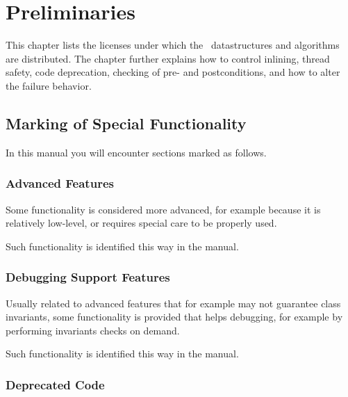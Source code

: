 
\chapter{Preliminaries}


This chapter lists the licenses
under which the \cgal\ datastructures and algorithms are distributed.
The chapter further explains how to control inlining, thread safety, 
code deprecation, checking of pre- and postconditions,
and how to alter the failure behavior. 





\section{Marking of Special Functionality}

In this manual you will encounter sections marked as follows.

\subsection{Advanced Features}

Some functionality is considered more advanced, for example because it is
relatively low-level, or requires special care to be properly used.

\begin{ccAdvanced}
Such functionality is identified this way in the manual.
\end{ccAdvanced}

\subsection{Debugging Support Features}

Usually related to advanced features that for example may not guarantee
class invariants, some functionality is provided that helps debugging,
for example by performing invariants checks on demand.

\begin{ccDebug}
Such functionality is identified this way in the manual.
\end{ccDebug}

\subsection{Deprecated Code}

